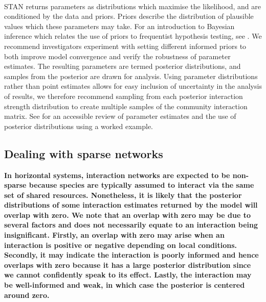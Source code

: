 \documentclass[a4,12pt]{article}
\begin{document}
\begin{refsection}
        \paragraph{}
        STAN returns parameters as distributions which maximise the likelihood, and are conditioned by the data and priors. Priors describe the distribution of plausible values which these parameters may take. For an introduction to Bayesian inference which relates the use of priors to frequentist hypothesis testing, see \textcite{Ellison1996}. We recommend investigators experiment with setting different informed priors to both improve model convergence and verify the robustness of parameter estimates. The resulting parameters are termed posterior distributions, and samples from the posterior are drawn for analysis. Using parameter distributions rather than point estimates allows for easy inclusion of uncertainty in the analysis of results, we therefore recommend sampling from each posterior interaction strength distribution to create multiple samples of the community interaction matrix. See \textcite{Ellison2004} for an accessible review of parameter estimates and the use of posterior distributions using a worked example.

    \subsection{Dealing with sparse networks}
    \label{meth:sparse}

    \textbf{In horizontal systems, interaction networks are expected to be non-sparse because species are typically assumed to interact via the same set of shared resources. Nonetheless, it is likely that the posterior distributions of some interaction estimates returned by the model will overlap with zero. We note that an overlap with zero may be due to several factors and does not necessarily equate to an interaction being insignificant. Firstly, an overlap with zero may arise when an interaction is positive or negative depending on local conditions. Secondly, it may indicate the interaction is poorly informed and hence overlaps with zero because it has a large posterior distribution since we cannot confidently speak to its effect. Lastly, the interaction may be well-informed and weak, in which case the posterior is centered around zero.}


\end{refsection}
\end{document}
